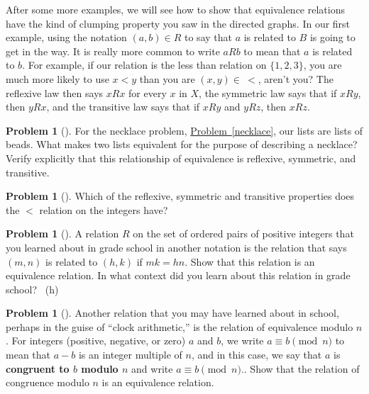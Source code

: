 \documentclass[10pt,]{book}
\newcommand{\terminology}[1]{\textbf{#1}}
\theoremstyle{plain}
\theoremstyle{definition}
\newtheorem{activity}[project]{Problem}
\theoremstyle{definition}
\numberwithin{equation}{chapter}
\newcommand{\lt}{<}
\begin{document}
\par
\hypertarget{p-1937}{}%
After some more examples, we will see how to show that equivalence relations have the kind of clumping property you saw in the directed graphs. In our first example, using the notation \((a,b) \in R\) to say that \(a\) is related to \(B\) is going to get in the way. It is really more common to write \(a
R b\) to mean that \(a\) is related to \(b\). For example, if our relation is the less than relation on \(\{1,2,3\}\), you are much more likely to use \(x\lt y\) than you are \((x,y)\in \ \lt\), aren't you? The reflexive law then says \(xRx\) for every \(x\) in \(X\), the symmetric law says that if \(xRy\), then \(yRx\), and the transitive law says that if \(xRy\) and \(yRz\), then \(xRz\).%
\begin{activity}[]\marginsymbol[-1em]{} \label{nchoosekanotherway}
\hypertarget{p-1938}{}%
For the necklace problem, \hyperref[necklace]{Problem~\ref{necklace}}, our lists are lists of beads. What makes two lists equivalent for the purpose of describing a necklace? Verify explicitly that this relationship of equivalence is reflexive, symmetric, and transitive.%
\end{activity}
\begin{activity}[]\marginsymbol[-1em]{} \label{activity-348}
\hypertarget{p-1940}{}%
Which of the reflexive, symmetric and transitive properties does the \(\lt\) relation on the integers have?%
\end{activity}
\begin{activity}[]\marginsymbol[-1em]{} \label{activity-349}
\hypertarget{p-1942}{}%
A relation \(R\) on the set of ordered pairs of positive integers that you learned about in grade school in another notation is the relation that says \((m,n)\) is related to \((h,k)\) if \(mk =hn\). Show that this relation is an equivalence relation. In what context did you learn about this relation in grade school?%
~{\tiny (h)}\end{activity}
\begin{activity}[]\marginsymbol[-1em]{} \label{activity-350}
\hypertarget{p-1945}{}%
Another relation that you may have learned about in school, perhaps in the guise of ``clock arithmetic,'' is the relation of equivalence modulo \(n\). For integers (positive, negative, or zero) \(a\) and \(b\), we write \(a
\equiv b \pmod{n}\) to mean that \(a-b\) is an integer multiple of \(n\), and in this case, we say that \(a\) is \terminology{congruent to \(b\) modulo \(n\)} and write \(a\equiv b \pmod{n}\).. Show that the relation of congruence modulo \(n\) is an equivalence relation.%
\end{activity}
\end{document}
